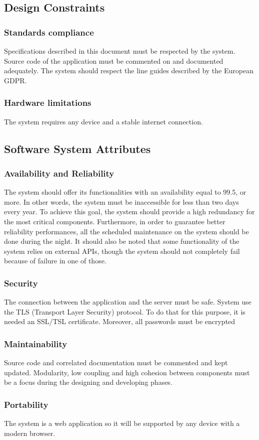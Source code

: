 \subsection{Design Constraints}


\subsubsection{Standards compliance}
Specifications described in this document must be respected by the system.
Source code of the application must be commented on and documented adequately.
The system should respect the line guides described by the European GDPR.

\subsubsection{Hardware limitations}
The system requires any device and a stable internet connection.

\subsection{Software System Attributes}

\subsubsection{Availability and Reliability}
The system should offer its functionalities with an availability
equal to 99.5, or more. In other words, the system must be inaccessible
for less than two days every year. To achieve this goal, the system should
provide a high redundancy for the most critical components.
Furthermore, in order to guarantee better reliability performances, all
the scheduled maintenance on the system should be done during
the night.
It should also be noted that some functionality of the system relies on external APIs, though the system should not completely fail
because of failure in one of those.

\subsubsection{Security}
The connection between the application and the server must be safe.
System use the TLS (Transport Layer Security) protocol.
To do that for this purpose, it is needed an SSL/TSL certificate.
Moreover, all passwords must be encrypted

\subsubsection{Maintainability}
Source code and correlated documentation must be commented and kept updated.
Modularity, low coupling and high cohesion between components must be a focus during the
designing and developing phases.

\subsubsection{Portability}
The system is a web application so it will be supported by any device with
a modern browser.